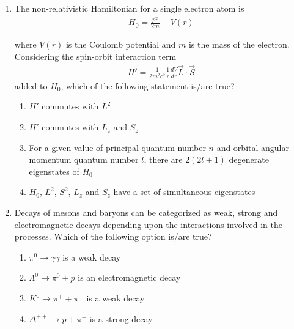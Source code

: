 \documentclass[journal,12pt,onecolumn]{IEEEtran}
\theoremstyle{remark}
\begin{document}
\begin{enumerate}
\item The non-relativistic Hamiltonian for a single electron atom is
\begin{align*}
    H_0 = \frac{p^2}{2m} - V(r)
\end{align*}

where $V(r)$ is the Coulomb potential and $m$ is the mass of the electron. Considering the spin-orbit interaction term
\begin{align*}
    H' = \frac{1}{2m^2c^2} \frac{1}{r} \frac{dV}{dr} \vec{L} \cdot \vec{S}
\end{align*}
added to $H_0$, which of the following statement is/are true?
\begin{enumerate}
    \item $H'$ commutes with $L^2$
    \item $H'$ commutes with $L_z$ and $S_z$
    \item For a given value of principal quantum number $n$ and orbital angular momentum quantum number $l$, there are $2(2l+1)$ degenerate eigenstates of $H_0$
    \item $H_0$, $L^2$, $S^2$, $L_z$ and $S_z$ have a set of simultaneous eigenstates
\end{enumerate}
\item Decays of mesons and baryons can be categorized as weak, strong and electromagnetic decays depending upon the interactions involved in the processes. Which of the following option is/are true?
\begin{enumerate}
    \item $\pi^0 \rightarrow \gamma \gamma$ is a weak decay
    \item $\Lambda^0 \rightarrow \pi^0 + p$ is an electromagnetic decay
    \item $K^0 \rightarrow \pi^+ + \pi^-$ is a weak decay
    \item $\Delta^{++} \rightarrow p + \pi^+$ is a strong decay
\end{enumerate}


\end{enumerate}
\end{document}
